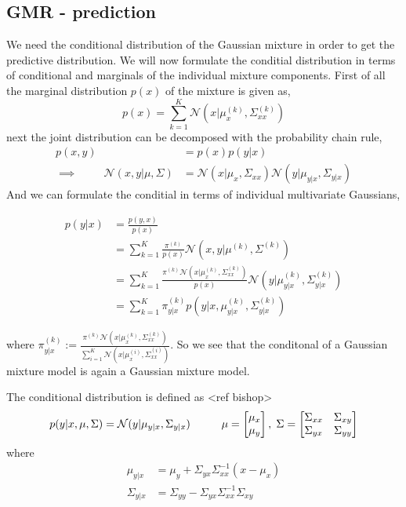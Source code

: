 \subsection{GMR - prediction}
We need the conditional distribution of the Gaussian mixture
in order to get the predictive distribution. We will now formulate
the conditial distribution in terms of conditional and marginals of
the individual mixture components. First of all the marginal distribution $p(x)$ 
of the mixture is given as, 
$$p(x) = \sum_{k=1}^K \mathcal{N}(x|\mu_{x}^{(k)},\Sigma_{xx}^{(k)})$$ 
next the joint distribution can be decomposed with the probability chain rule,
\begin{align*}
    p(x,y) &= p(x)p(y|x)\\
    \implies \hspace{1cm} \mathcal{N}(x,y|\mu,\Sigma) &= 
    \mathcal{N}(x|\mu_{x},\Sigma_{xx}) \mathcal{N}(y|\mu_{y|x},\Sigma_{y|x})
\end{align*} 
And we can formulate the conditial in terms of individual multivariate Gaussians, 

\begin{align}
    p(y|x) &= \frac{p(y,x)}{p(x)}\\
    &= \sum_{k=1}^K \frac{\pi^{(k)}}{p(x)} \mathcal{N}(x,y|\mu^{(k)},\Sigma^{(k)})\\
    &=  \sum_{k=1}^K \frac{\pi^{(k)} \mathcal{N}(x|\mu_{x}^{(k)},\Sigma_{xx}^{(k)})}{p(x)}\mathcal{N}(y|\mu_{y|x}^{(k)},\Sigma_{y|x}^{(k)})\\
    &=  \sum_{k=1}^K \pi_{y|x}^{(k)} p(y|x,\mu_{y|x}^{(k)},\Sigma_{y|x}^{(k)})
\end{align}

where $\pi_{y|x}^{(k)} := \frac{\pi^{(k)} \mathcal{N}(x|\mu_{x}^{(k)},\Sigma_{xx}^{(k)})}
{\sum_{i=1}^K \mathcal{N}(x|\mu_{x}^{(i)},\Sigma_{xx}^{(i)})}$. So we see that 
the conditonal of a Gaussian mixture model is again a Gaussian mixture model.


\begin{testexample2}
    The conditional distribution is defined as <ref bishop>
    $$p(y|x,\mu, \Sigma) = \mathcal{N}(y|\mu_{y|x},\Sigma_{y|x} )\hspace{1cm} \mu=\begin{bmatrix}
        \mu_x \\ \mu_y
    \end{bmatrix},\hspace{0.1cm} \Sigma = \begin{bmatrix}
        \Sigma_{xx} & \Sigma_{xy}\\ \Sigma_{yx}& \Sigma_{yy}
    \end{bmatrix}$$ 
    where 
    \begin{align}
        \mu_{y|x} &= \mu_y+\Sigma_{yx}\Sigma_{xx}^{-1}(x-\mu_x)\\
        \Sigma_{y|x} &= \Sigma_{yy}-\Sigma_{yx}\Sigma_{xx}^{-1}\Sigma_{xy} 
    \end{align}
    
\end{testexample2}


